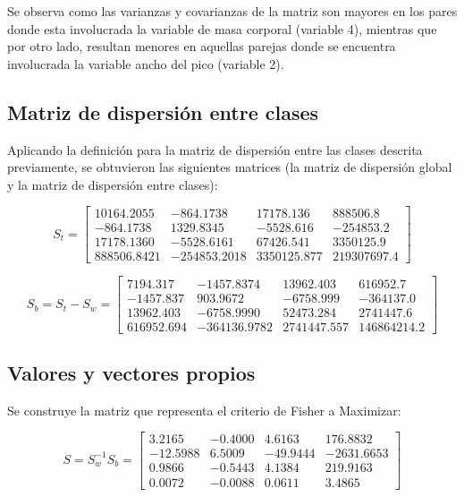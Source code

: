 \documentclass[11pt, letterpaper]{article}
\begin{document}
Se observa como las varianzas y covarianzas de la matriz son mayores en los pares donde esta involucrada la variable de masa corporal (variable 4), mientras que por otro lado, resultan menores en aquellas parejas donde se encuentra involucrada la variable ancho del pico (variable 2).


\newpage

\subsection{Matriz de dispersión entre clases}

Aplicando la definición para la matriz de dispersión entre las clases descrita previamente, se obtuvieron las siguientes matrices (la matriz de dispersión global y la matriz de dispersión entre clases):

$$
S_t = 
\begin{bmatrix}
10164.2055 & -864.1738 & 17178.136 & 888506.8 \\
-864.1738 & 1329.8345 & -5528.616 & -254853.2 \\
17178.1360 & -5528.6161 & 67426.541 & 3350125.9 \\
888506.8421 & -254853.2018 & 3350125.877 & 219307697.4
\end{bmatrix}
$$

$$
S_b = S_t-S_w = 
\begin{bmatrix}
7194.317 & -1457.8374 & 13962.403 & 616952.7 \\
-1457.837 & 903.9672 & -6758.999 & -364137.0 \\
13962.403 & -6758.9990 & 52473.284 & 2741447.6 \\
616952.694 & -364136.9782 & 2741447.557 & 146864214.2
\end{bmatrix}
$$

\newpage


\subsection{Valores y vectores propios}

Se construye la matriz que representa el criterio de Fisher a Maximizar:

$$S = S_w^{-1}S_b = 
\begin{bmatrix}
3.2165 & -0.4000 & 4.6163 & 176.8832 \\
-12.5988 & 6.5009 & -49.9444 & -2631.6653 \\
0.9866 & -0.5443 & 4.1384 & 219.9163 \\
0.0072 & -0.0088 & 0.0611 & 3.4865
\end{bmatrix}
$$
\end{document}
